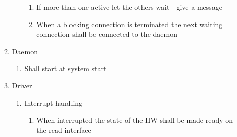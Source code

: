 \documentclass[12pt,a4paper]{report}
\begin{document}
\begin{enumerate}
\begin{enumerate}
\begin{enumerate}
		\begin{enumerate}
			\item If more than one active let the others wait - give a message
			\item When a blocking connection is terminated the next waiting connection shall be connected to the daemon
		\end{enumerate}
	\end{enumerate}
	\item Daemon
	\begin{enumerate}
		\item Shall start at system start
	\end{enumerate}
	\item Driver
	\begin{enumerate}
		\item Interrupt handling
		\begin{enumerate}
			\item When interrupted the state of the HW shall be made ready on the read interface
		\end{enumerate}
	\end{enumerate}
	
\end{enumerate}



\end{enumerate}
\end{document}
